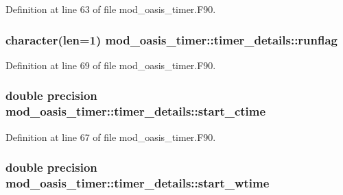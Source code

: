 Definition at line 63 of file mod\+\_\+oasis\+\_\+timer.\+F90.

\hypertarget{structmod__oasis__timer_1_1timer__details_ac91fc6e6c7d8bca9c4519b506714384a}{
\subsubsection[{runflag}]{\setlength{\rightskip}{0pt plus 5cm}character(len=1) mod\+\_\+oasis\+\_\+timer\+::timer\+\_\+details\+::runflag\hspace{0.3cm}{\ttfamily [private]}}}\label{structmod__oasis__timer_1_1timer__details_ac91fc6e6c7d8bca9c4519b506714384a}


Definition at line 69 of file mod\+\_\+oasis\+\_\+timer.\+F90.

\hypertarget{structmod__oasis__timer_1_1timer__details_a2922806fc675af7b8aa9ab042bddfc24}{
\subsubsection[{start\+\_\+ctime}]{\setlength{\rightskip}{0pt plus 5cm}double precision mod\+\_\+oasis\+\_\+timer\+::timer\+\_\+details\+::start\+\_\+ctime\hspace{0.3cm}{\ttfamily [private]}}}\label{structmod__oasis__timer_1_1timer__details_a2922806fc675af7b8aa9ab042bddfc24}


Definition at line 67 of file mod\+\_\+oasis\+\_\+timer.\+F90.

\hypertarget{structmod__oasis__timer_1_1timer__details_a1b05dff81a75201d26ba232a265f70d0}{
\subsubsection[{start\+\_\+wtime}]{\setlength{\rightskip}{0pt plus 5cm}double precision mod\+\_\+oasis\+\_\+timer\+::timer\+\_\+details\+::start\+\_\+wtime\hspace{0.3cm}{\ttfamily [private]}}}\label{structmod__oasis__timer_1_1timer__details_a1b05dff81a75201d26ba232a265f70d0}


